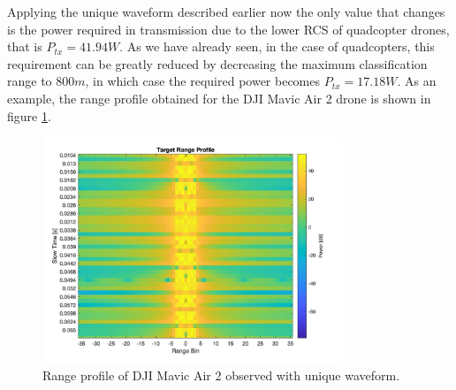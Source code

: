 Applying the unique waveform described earlier now the only value that changes is the power required in transmission due to the lower RCS of quadcopter drones, that is $P_{tx} = 41.94 W$. As we have already seen, in the case of quadcopters, this requirement can be greatly reduced by decreasing the maximum classification range to $800m$, in which case the required power becomes $P_{tx} = 17.18W$.
As an example, the range profile obtained for the DJI Mavic Air 2 drone is shown in figure \ref{DJI-unique-wave-rt}.

\begin{figure}[h!]
\centering
\includegraphics[width=9cm]{FMCW mD analysis-chap4/img/DJI Air 2_rt_unique.jpg}
\caption{Range profile of DJI Mavic Air 2 observed with unique waveform.}
\label{DJI-unique-wave-rt}
\end{figure}


